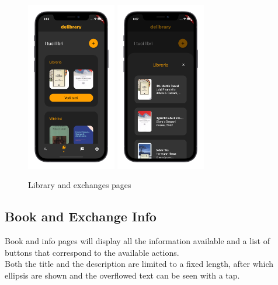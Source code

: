 \begin{figure}[H]
{            \includegraphics[width=0.35\textwidth]{screens/mock/smartphone/library.png}
            \includegraphics[width=0.35\textwidth]{screens/mock/smartphone/library-expanded.png}
      }
      \caption{Library and exchanges pages}
\end{figure}

\subsection{Book and Exchange Info}
Book and info pages will display all the information available and a list of buttons that correspond to the available actions.\\
Both the title and the description are limited to a fixed length, after which ellipsis are shown and the overflowed text can be seen with a tap.

